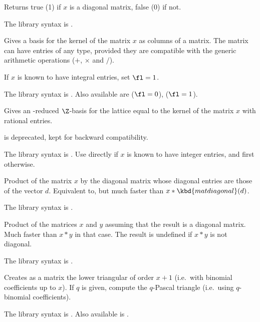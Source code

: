 \label{se:matisdiagonal}
Returns true (1) if $x$ is a diagonal matrix, false (0) if not.

The library syntax is .

\label{se:matker}
Gives a basis for the kernel of the matrix $x$ as columns of a matrix.
The matrix can have entries of any type, provided they are compatible with
the generic arithmetic operations ($+$, $\times$ and $/$).

If $x$ is known to have integral entries, set $\fl=1$.

The library syntax is .
Also available are  ($\fl=0$),
 ($\fl=1$).

\label{se:matkerint}
Gives an -reduced $\Z$-basis
for the lattice equal to the kernel of the matrix $x$ with rational entries.

\fl is deprecated, kept for backward compatibility.

The library syntax is .
Use directly  if $x$ is known to have
integer entries, and  first otherwise.

\label{se:matmuldiagonal}
Product of the matrix $x$ by the diagonal
matrix whose diagonal entries are those of the vector $d$. Equivalent to,
but much faster than $x*\kbd{matdiagonal}(d)$.

The library syntax is .

\label{se:matmultodiagonal}
Product of the matrices $x$ and $y$ assuming that the result is a
diagonal matrix. Much faster than $x*y$ in that case. The result is
undefined if $x*y$ is not diagonal.

The library syntax is .

\label{se:matpascal}
Creates as a matrix the lower triangular
 of order $x+1$ (i.e.~with binomial coefficients
up to $x$). If $q$ is given, compute the $q$-Pascal triangle (i.e.~using
$q$-binomial coefficients).

The library syntax is .
Also available is .

